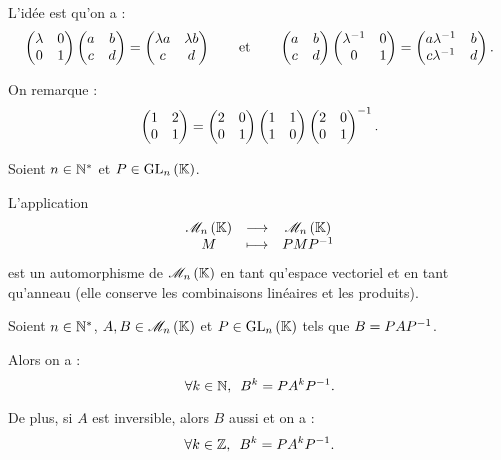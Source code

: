 \begin{corr}
L'idée est qu'on a : \[\begin{pmatrix}
\lambda & 0 \\
0 & 1
\end{pmatrix}\begin{pmatrix}
a & b \\
c & d
\end{pmatrix}=\begin{pmatrix}
\lambda a & \lambda b \\
c & d
\end{pmatrix}\qquad\text{et}\qquad\begin{pmatrix}
a & b \\
c & d
\end{pmatrix}\begin{pmatrix}
\lambda^{-1} & 0 \\
0 & 1
\end{pmatrix}=\begin{pmatrix}
a \lambda^{-1} & b \\
c \lambda^{-1} & d
\end{pmatrix}.\]

On remarque : \[\begin{pmatrix}
1 & 2 \\
0 & 1
\end{pmatrix}=\begin{pmatrix}
2 & 0 \\
0 & 1
\end{pmatrix}\begin{pmatrix}
1 & 1 \\
1 & 0
\end{pmatrix}\begin{pmatrix}
2 & 0 \\
0 & 1
\end{pmatrix}^{-1}.\]
\end{corr}

\begin{rem}
Soient \(n\in\mathbb{N}^*\) et \(P\in\GL{n}\).

L'application \[\fonctionlambda{\M{n}}{\M{n}}{M}{PMP\inv}\] est un automorphisme de \(\M{n}\) en tant qu'espace vectoriel et en tant qu'anneau (elle conserve les combinaisons linéaires et les produits).
\end{rem}

\begin{rem}
Soient \(n\in\mathbb{N}^*\), \(A,B\in\M{n}\) et \(P\in\GL{n}\) tels que \(B=PAP^{-1}\).

Alors on a : \[\quantifs{\forall k\in\N}B^k=PA^kP\inv.\]

De plus, si \(A\) est inversible, alors \(B\) aussi et on a : \[\quantifs{\forall k\in\Z}B^k=PA^kP\inv.\]
\end{rem}

